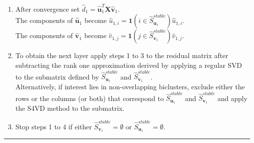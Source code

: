 \begin{enumerate}
\begin{enumerate}
  \end{enumerate} 
  \item After convergence set $\hat{d}_{1}=\mathbf{\hat{u}}_{1}^{T}\mathbf{X}\mathbf{\hat{v}}_{1}$. \\
  The components of $\hat{\mathbf{u}}_{1}$ become $\hat{u}_{1,i}=\mathbf{1}(i \in \hat{S}_{\mathbf{u}_{1}}^{stable})\hat{u}_{1,i}$. \\
  The components of $\hat{\mathbf{v}}_{1}$ become $\hat{v}_{1,j}=\mathbf{1}(j \in \hat{S}_{\mathbf{v}_{1}}^{stable})\hat{v}_{1,j}$. 
 \item To obtain the next layer apply steps 1 to 3 to the residual matrix after subtracting the rank one approximation derived by applying a regular SVD to the submatrix defined by $\hat{S}_{\mathbf{u}_{1}}^{stable}$ and $\hat{S}_{\mathbf{v}_{1}}^{stable}$. \\
 Alternatively, if interest lies in non-overlapping biclusters, exclude either the rows or the columns (or both) that correspond to $\hat{S}_{\mathbf{u}_{1}}^{stable}$ and $\hat{S}_{\mathbf{v}_{1}}^{stable}$ and apply the S4VD method to the submatrix.
 \item Stop steps 1 to 4 if either $\hat{S}_{\mathbf{v}_{1}}^{stable}=\emptyset$ or $\hat{S}_{\mathbf{u}_{1}}^{stable}=\emptyset$.
\end{enumerate}
\hspace{-0.1cm} 
\rule{14.75 cm}{1pt}
\newpage

